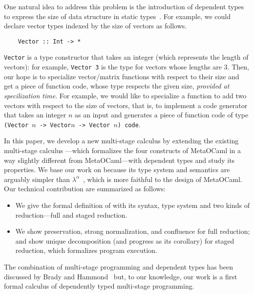 
One natural idea to address this problem is the introduction of dependent types
to express the size of data structure in static types~\cite{Xi98}.
For example, we could declare vector types indexed by the size of
vectors as follows.
\begin{verbatim}
    Vector :: Int -> *
\end{verbatim}
\verb|Vector| is a type constructor that takes an integer (which
represents the length of vectors): for example, \verb|Vector 3| is the
type for vectors whose lengths are 3.  Then, our hope is to specialize
vector/matrix functions with respect to their size and get a piece of
function code, whose type respects the given size, \emph{provided at
  specilization time}.  For example, we would like to specialize a
function to add two vectors with respect to the size of vectors, that
is, to implement a code generator that takes an integer $n$ as an
input and generates a piece of function code of type
\verb|(Vector |$n$\verb| -> Vector|$n$\verb| -> Vector |$n$\verb|) code|.


In this paper, we develop a new multi-stage calculus \LMD by extending
the existing multi-stage calculus \LTP\cite{Hanada2014}---which
formalizes the four constructs of MetaOCaml in a way slightly
different from MetaOCaml---with dependent types and study its
properties.  We base our work on \LTP because its type system and
semantics are arguably simpler than
\(\lambda^\alpha\)~\cite{taha2003environment}, which is more faithful
to the design of MetaOCaml.  Our technical contribution are summarized
as follows:
\begin{itemize}
\item We give the formal definition of \LMD with its syntax, 
  type system and two kinds of reduction---full and staged reduction.
\item We show preservation, strong normalization, and confluence for
  full reduction; and show unique decomposition (and progress as its
  corollary) for staged reduction, which formalizes program execution.
\end{itemize}
The combination of multi-stage programming and dependent types has
been discussed by Brady and Hammond~\cite{brady2006dependently} but,
to our knowledge, our work is a first formal calculus of dependently
typed multi-stage programming.

